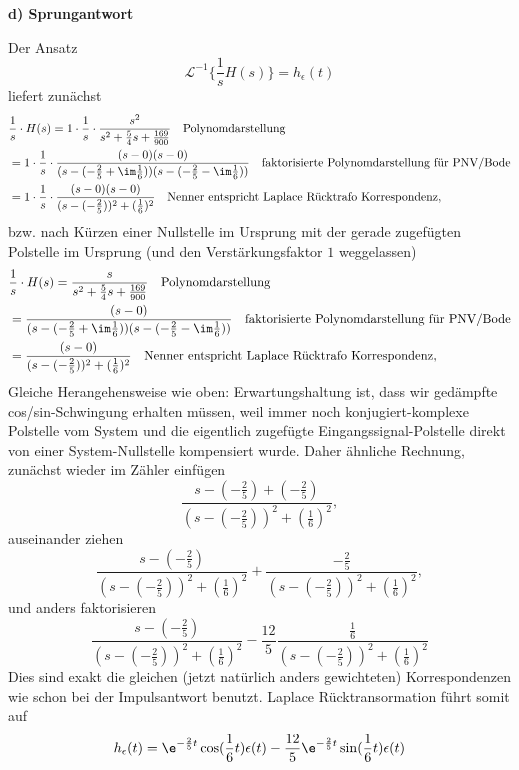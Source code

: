 \begin{ExCalc}
\noindent \textbf{d) Sprungantwort}

Der Ansatz $$\mathcal{L}^{-1}\{\frac{1}{s} H(s)\} = h_\epsilon(t)$$
liefert zunächst
\begin{align}
&\frac{1}{s}\cdot H(s) = 1 \cdot \frac{1}{s}\cdot \frac{s^2}{s^2 + \frac{5}{4} s + \frac{169}{900}}\quad\text{Polynomdarstellung}\\
&= 1 \cdot \frac{1}{s}\cdot \frac{(s-0)(s-0)}{(s-(-\frac{2}{5} + \im \frac{1}{6}))(s-(-\frac{2}{5} - \im \frac{1}{6}))}\quad\text{faktorisierte Polynomdarstellung für PNV/Bode}\\
&= 1 \cdot \frac{1}{s}\cdot \frac{(s-0)(s-0)}{(s-(-\frac{2}{5}))^2+(\frac{1}{6})^2}\quad\text{Nenner entspricht Laplace Rücktrafo Korrespondenz},
\end{align}
bzw. nach Kürzen einer Nullstelle im Ursprung mit der gerade zugefügten Polstelle im Ursprung (und den Verstärkungsfaktor $1$ weggelassen)
\begin{align}
&\frac{1}{s}\cdot H(s) = \frac{s}{s^2 + \frac{5}{4} s + \frac{169}{900}}\quad\text{Polynomdarstellung}\\
&= \frac{(s-0)}{(s-(-\frac{2}{5} + \im \frac{1}{6}))(s-(-\frac{2}{5} - \im \frac{1}{6}))}\quad\text{faktorisierte Polynomdarstellung für PNV/Bode}\\
&= \frac{(s-0)}{(s-(-\frac{2}{5}))^2+(\frac{1}{6})^2}\quad\text{Nenner entspricht Laplace Rücktrafo Korrespondenz},
\end{align}
Gleiche Herangehensweise wie oben: Erwartungshaltung ist, dass wir gedämpfte cos/sin-Schwingung erhalten müssen, weil immer noch konjugiert-komplexe Polstelle vom System und die eigentlich zugefügte Eingangssignal-Polstelle direkt von einer System-Nullstelle kompensiert wurde. Daher ähnliche Rechnung, zunächst wieder im Zähler einfügen
$$\frac{s-(-\frac{2}{5})+(-\frac{2}{5})}{(s-(-\frac{2}{5}))^2+(\frac{1}{6})^2},$$
auseinander ziehen
$$\frac{s-(-\frac{2}{5})}{(s-(-\frac{2}{5}))^2+(\frac{1}{6})^2} + \frac{-\frac{2}{5}}{(s-(-\frac{2}{5}))^2+(\frac{1}{6})^2},$$
und anders faktorisieren
$$\frac{s-(-\frac{2}{5})}{(s-(-\frac{2}{5}))^2+(\frac{1}{6})^2} - \frac{12}{5} \frac{\frac{1}{6}}{(s-(-\frac{2}{5}))^2+(\frac{1}{6})^2}$$
Dies sind exakt die gleichen (jetzt natürlich anders gewichteten) Korrespondenzen wie schon bei der Impulsantwort benutzt.
%
Laplace Rücktransormation führt somit auf
\begin{align}
h_\epsilon(t) =
\e^{-\frac{2}{5}t} \cos(\frac{1}{6}t)\epsilon(t)
- \frac{12}{5} \e^{-\frac{2}{5}t} \sin(\frac{1}{6}t)\epsilon(t)
\end{align}
\end{ExCalc}















